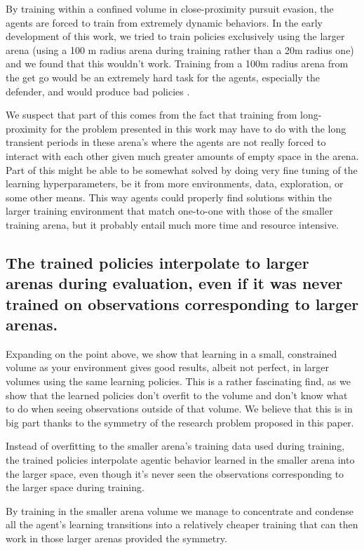 By training within a confined volume in close-proximity pursuit evasion, the agents are forced to train from extremely dynamic behaviors. In the early development of this work, we tried to train policies exclusively using the larger arena (using a 100 m radius arena during training rather than a 20m radius one) and we found that this wouldn't work. Training from a 100m radius arena from the get go would be an extremely hard task for the agents, especially the defender, and would produce bad policies .

We suspect that part of this comes from the fact that training from long-proximity for the problem presented in this work may have to do with the long transient periods in these arena's where the agents are not really forced to interact with each other given much greater amounts of empty space in the arena. Part of this might be able to be somewhat solved by doing very fine tuning of the learning hyperparameters, be it from more environments, data, exploration, or some other means. This way agents could properly find solutions within the larger training environment that match one-to-one with those of the smaller training arena, but it probably entail much more time and resource intensive.



\subsection*{The trained policies  interpolate to larger arenas during evaluation, even if it was never trained on observations corresponding to larger arenas.}


Expanding on the point above, we show that learning in a small, constrained volume as your environment gives good results, albeit not perfect, in larger volumes using the same learning policies. This is a rather fascinating find, as we show that the learned policies don't overfit to the volume and don't know what to do when seeing observations outside of that volume. We believe that this is in big part thanks to the symmetry of the research problem proposed in this paper. 

Instead of overfitting to the smaller arena's training data used during training, the trained policies interpolate agentic behavior learned in the smaller arena into the larger space, even though it's never seen the observations corresponding to the larger space during training.

 By training in the smaller arena volume we manage to concentrate and condense all the agent's learning transitions into a relatively cheaper training that can then work in those larger arenas provided the symmetry.

